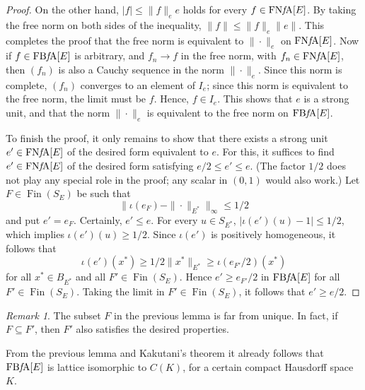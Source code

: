 \documentclass{memo-l}
\theoremstyle{definition}
\theoremstyle{remark}
\newtheorem{rem}[theorem]{Remark}
\numberwithin{section}{chapter}
\numberwithin{equation}{chapter}
\newcommand{\FNFA}[1]{\operatorname{FN{\it f}\!A}[#1]}
\newcommand{\FBFA}[1]{\operatorname{FB{\it f}\!A}[#1]}
\DeclareMathOperator{\Fin}{Fin}
\begin{document}
\begin{proof}
    On the other hand, $|f|\le \|f\|_e e$ holds for every $f \in \FNFA
    E$. By taking the free norm on both sides of the inequality,
    $\|f\|\le \|f\|_e \|e\|$. This completes the proof that the free
    norm is equivalent to $\|{\cdot }\|_e$ on $\FNFA E$. Now if $f \in
    \FBFA E$ is arbitrary, and $f_n\to f$ in the free norm, with $f_n
    \in \FNFA E$, then $(f_n)$ is also a Cauchy sequence in the norm
    $\|{\cdot }\|_e$. Since this norm is complete, $(f_n)$ converges
    to an element of $I_e$; since this norm is equivalent to the free
    norm, the limit must be $f$. Hence, $f \in I_e$. This shows that
    $e$ is a strong unit, and that the norm $\|{\cdot }\|_e$ is
    equivalent to the free norm on $\FBFA E$.

    To finish the proof, it only remains to show that there exists a
    strong unit $e' \in \FNFA E$ of the desired form equivalent to
    $e$. For this, it
    suffices to find $e' \in \FNFA E$ of the desired form satisfying $e/2\le e'\le e$.
    (The factor $1/2$ does not play any special role in the proof; any scalar in $(0,1)$ would also work.) Let
    $F \in \Fin(S_E)$ be such that
    \[
        \|\iota (e_F)-\|{\cdot }\|_{E^{*}}\|_\infty \le 1/2
    \]
    and put $e'=e_F$. Certainly, $e'\le e$. For every $u \in S_{E^{*}}$,
    $|\iota (e')(u)-1|\le 1/2$, which implies $\iota (e')(u)\ge 1/2$.
    Since $\iota (e')$ is
    positively homogeneous, it follows that
    \[
        \iota (e')(x^{*})\ge 1/2 \|x^{*}\|_{E^{*}}\ge
        \iota (e_{F'}/2)(x^{*})
    \]
    for all $x^{*}\in B_{E^{*}}$ and all $F' \in \Fin(S_{E})$. Hence
    $e'\ge e_{F'}/2$ in $\FBFA E$ for all $F' \in \Fin(S_E)$. Taking
    the limit in $F' \in \Fin(S_{E})$, it follows that $e'\ge e/2$.
\end{proof}

\begin{rem}
    The subset $F$ in the previous lemma is far from unique. In fact, if
    $F\subseteq F'$, then $F'$ also satisfies the desired properties.
\end{rem}

From the previous lemma and Kakutani's theorem it already follows that
$\FBFA E$ is lattice isomorphic to $C(K)$, for a certain compact
Hausdorff space $K$.
\end{document}
